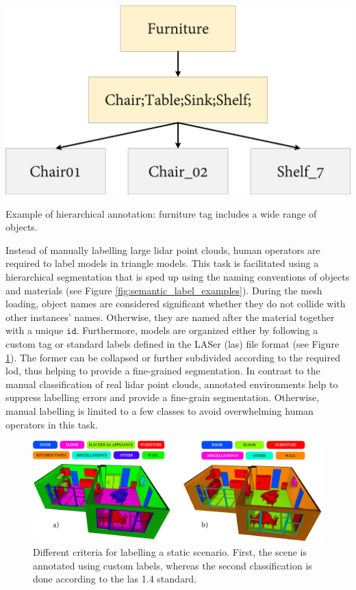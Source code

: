 \begin{marginfigure}[1.5cm]
    \centering
    \includegraphics[width=\linewidth]{figs/lidar_simulation/semantic_labels_example.png}
	\caption{Example of hierarchical annotation: furniture tag includes a wide range of objects. }
	\label{fig:semantic_label_examples}
\end{marginfigure}
Instead of manually labelling large \acrshort{lidar} point clouds, human operators are required to label models in triangle models. This task is facilitated using a hierarchical segmentation that is sped up using the naming conventions of objects and materials (see Figure \ref{fig:semantic_label_examples}). During the mesh loading, object names are considered significant whether they do not collide with other instances' names. Otherwise, they are named after the material together with a unique $\mathtt{id}$. Furthermore, models are organized either by following a custom tag or standard labels defined in the LASer (\acrshort{las}) file format (see Figure \ref{fig:kitchen_classification}). The former can be collapsed or further subdivided according to the required \acrshort{lod}, thus helping to provide a fine-grained segmentation. In contrast to the manual classification of real \acrshort{lidar} point clouds, annotated environments help to suppress labelling errors and provide a fine-grain segmentation. Otherwise, manual labelling is limited to a few classes to avoid overwhelming human operators in this task.

\begin{figure}[ht]
    \centering
    \includegraphics[width=\linewidth]{figs/lidar_simulation/semantic_labels.png}
	\caption{Different criteria for labelling a static scenario. First, the scene is annotated using custom labels, whereas the second classification is done according to the \acrshort{las} 1.4 standard.}
	\label{fig:kitchen_classification}
\end{figure}

